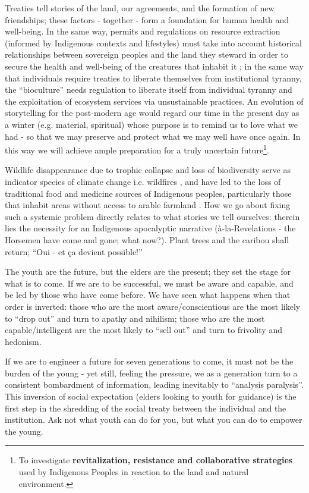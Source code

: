 \documentclass{report}
\begin{document}
Treaties tell stories of the land, our agreements, and the formation of new friendships; these factors - together - form a foundation for human health and well-being. In the same way, permits and regulations on resource extraction (informed by Indigenous contexts and lifestyles) must take into account historical relationships between sovereign peoples and the land they steward in order to secure the health and well-being of the creatures that inhabit it \parencite{togetherness}; in the same way that individuals require treaties to liberate themselves from institutional tyranny, the ``bioculture'' needs regulation to liberate itself from individual tyranny and the exploitation of ecosystem services via unsustainable practices. An evolution of storytelling for the post-modern age would regard our time in the present day as a winter (e.g. material, spiritual) whose purpose is to remind us to love what we had - so that we may preserve and protect what we may well have once again. In this way we will achieve ample preparation for a truly uncertain future\footnote{To investigate \textbf{revitalization, resistance and collaborative strategies} used by Indigenous Peoples in reaction to the land and natural environment. }.

Wildlife disappearance due to trophic collapse and loss of biodiversity serve as indicator species of climate change i.e. wildfires \parencite{nwtcaribou}, and have led to the loss of traditional food and medicine sources of Indigenous peoples, particularly those that inhabit areas without access to arable farmland \parencite{jonassangris}. How we go about fixing such a systemic problem directly relates to what stories we tell ourselves: therein lies the necessity for an Indigenous apocalyptic narrative (à-la-Revelations - the Horsemen have come and gone; what now?). Plant trees and the caribou shall return; ``Oui - et ça devient possible!''

The youth are the future, but the elders are the present; they set the stage for what is to come. If we are to be successful, we must be aware and capable, and be led by those who have come before. We have seen what happens when that order is inverted: those who are the most aware/conscientious are the most likely to ``drop out'' and turn to apathy and nihilism; those who are the most capable/intelligent are the most likely to ``sell out'' and turn to frivolity and hedonism.

If we are to engineer a future for seven generations to come, it must not be the burden of the young - yet still, feeling the pressure, we as a generation turn to a consistent bombardment of information, leading inevitably to ``analysis paralysis''. This inversion of social expectation (elders looking to youth for guidance) is the first step in the shredding of the social treaty between the individual and the institution. Ask not what youth can do for you, but what you can do to empower the young.

\clearpage

\printbibliography
\end{document}

